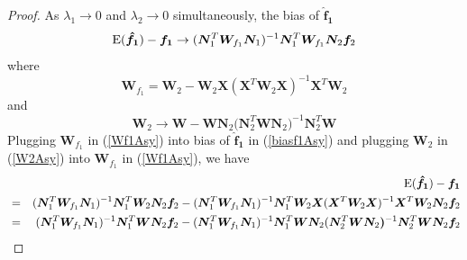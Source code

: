 \documentclass[review]{elsarticle}
\begin{document}
\begin{proof}
As $\lambda_1 \to 0$ and $\lambda_2 \to 0$ simultaneously, the bias of $\bm {\hat f_1}$  
\begin{equation} \label{biasf1Asy}
{\rm E}(\boldsymbol {\hat f_1}) - \boldsymbol { f_1}
\to
(\boldsymbol N_1^T \boldsymbol W_{f_1}  \boldsymbol N_1)^{-1}  
\boldsymbol N_1^T \boldsymbol W_{f_1}
\boldsymbol N_2 \boldsymbol f_2
\end{equation}
where
\begin{equation} \label{Wf1Asy}
\boldsymbol W_{f_1} 
=
\boldsymbol W_2 - \boldsymbol W_2\boldsymbol X(\boldsymbol X^T  \boldsymbol W_2\boldsymbol X)^{-1}  \boldsymbol X^T  \boldsymbol W_2 
\end{equation}
and
\begin{equation} \label{W2Asy}
\boldsymbol W_2 \to
 \boldsymbol W 
 -
\boldsymbol W \boldsymbol N_2 
 (\boldsymbol N_2^T  \boldsymbol W \boldsymbol N_2 \boldsymbol)^{-1} 
 \boldsymbol N_2^T  \boldsymbol W
\end{equation}
Plugging $\bm W_{f_1}$ in (\ref{Wf1Asy}) into bias of $\bm {\hat f_1}$ in (\ref{biasf1Asy}) and plugging $\bm W_2$ in (\ref{W2Asy}) into $\bm W_{f_1}$ in (\ref{Wf1Asy}), we have 
\begin{eqnarray*}
&& 
{\rm E}(\boldsymbol {\hat f_1}) - \boldsymbol { f_1}\\
&=& 
(\boldsymbol N_1^T \boldsymbol W_{f_1}  \boldsymbol N_1)^{-1}  
\boldsymbol N_1^T 
\boldsymbol W_2 \boldsymbol N_{2} \boldsymbol f_2
-
(\boldsymbol N_1^T \boldsymbol W_{f_1}  \boldsymbol N_1)^{-1}  \boldsymbol N_1^T 
\boldsymbol W_2 \boldsymbol X(\boldsymbol X^T  \boldsymbol W_2\boldsymbol X)^{-1}  \boldsymbol X^T  \boldsymbol W_2
\boldsymbol N_2 \boldsymbol f_2\\
&=& 
(\boldsymbol N_1^T \boldsymbol W_{f_1}  \boldsymbol N_1)^{-1}  \boldsymbol N_1^T 
\boldsymbol W\boldsymbol N_{2} \boldsymbol f_2
 -
 (\boldsymbol N_1^T \boldsymbol W_{f_1}  \boldsymbol N_1)^{-1}  \boldsymbol N_1^T 
\boldsymbol W \boldsymbol N_2 
 (\boldsymbol N_2^T  \boldsymbol W \boldsymbol N_2 \boldsymbol)^{-1} 
 \boldsymbol N_2^T  \boldsymbol W \boldsymbol N_{2} \boldsymbol f_2\\

\end{eqnarray*}
\end{proof}
\end{document}
